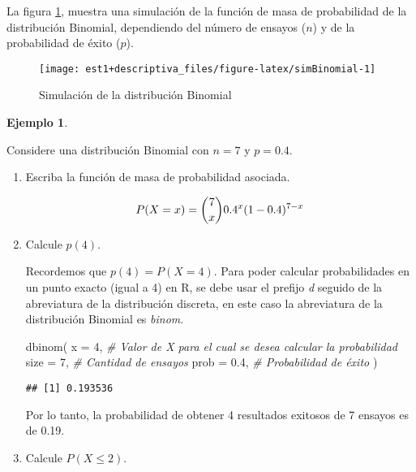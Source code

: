 \documentclass[
]{book}
\newenvironment{Shaded}{\begin{snugshade}}{\end{snugshade}}
\newcommand{\AttributeTok}[1]{\textcolor[rgb]{0.77,0.63,0.00}{#1}}
\newcommand{\CommentTok}[1]{\textcolor[rgb]{0.56,0.35,0.01}{\textit{#1}}}
\newcommand{\DecValTok}[1]{\textcolor[rgb]{0.00,0.00,0.81}{#1}}
\newcommand{\FloatTok}[1]{\textcolor[rgb]{0.00,0.00,0.81}{#1}}
\newcommand{\FunctionTok}[1]{\textcolor[rgb]{0.00,0.00,0.00}{#1}}
\newcommand{\NormalTok}[1]{#1}
\theoremstyle{definition}
\theoremstyle{definition}
\newtheorem{example}{Ejemplo}[chapter]
\theoremstyle{definition}
\theoremstyle{definition}
\theoremstyle{remark}
\begin{document}
La figura \ref{fig:simBinomial}, muestra una simulación de la función de masa de probabilidad de la distribución Binomial, dependiendo del número de ensayos (\(n\)) y de la probabilidad de éxito (\(p\)).

\begin{figure}

{\centering \texttt{[image: est1+descriptiva\_files/figure-latex/simBinomial-1]} 

}

\caption{Simulación de la distribución Binomial}\label{fig:simBinomial}
\end{figure}

\begin{example}
\protect\hypertarget{exm:ejcomandosbin}{}\label{exm:ejcomandosbin}

Considere una distribución Binomial con \(n = 7\) y \(p = 0.4\).

\begin{enumerate}
\def\labelenumi{\alph{enumi}.}
\item
  Escriba la función de masa de probabilidad asociada.

  \begin{equation}
  \notag
  P(X=x) = \binom{7}{x}0.4^x(1-0.4)^{7-x}
  \end{equation}
\item
  Calcule \(p(4)\).

  Recordemos que \(p(4) = P(X = 4)\). Para poder calcular probabilidades en un punto exacto (igual a 4) en R, se debe usar el prefijo \emph{d} seguido de la abreviatura de la distribución discreta, en este caso la abreviatura de la distribución Binomial es \emph{binom}.

\begin{Shaded}
\begin{Highlighting}[]
\FunctionTok{dbinom}\NormalTok{(}
  \AttributeTok{x =} \DecValTok{4}\NormalTok{, }\CommentTok{\# Valor de X para el cual se desea calcular la probabilidad}
  \AttributeTok{size =} \DecValTok{7}\NormalTok{, }\CommentTok{\# Cantidad de ensayos}
  \AttributeTok{prob =} \FloatTok{0.4}\NormalTok{, }\CommentTok{\# Probabilidad de éxito}
\NormalTok{)}
\end{Highlighting}
\end{Shaded}

\begin{verbatim}
## [1] 0.193536
\end{verbatim}

  Por lo tanto, la probabilidad de obtener 4 resultados exitosos de 7 ensayos es de 0.19.
\item
  Calcule \(P(X\leq 2)\).


\end{enumerate}
\end{example}
\end{document}
